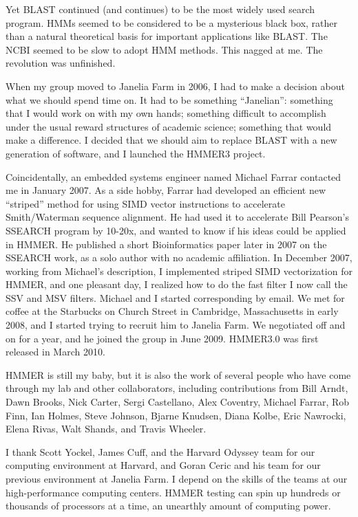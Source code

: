 Yet BLAST continued (and continues) to be the most widely used search
program. HMMs seemed to be considered to be a mysterious black box,
rather than a natural theoretical basis for important applications
like BLAST. The NCBI seemed to be slow to adopt HMM methods. This
nagged at me. The revolution was unfinished.

When my group moved to Janelia Farm in 2006, I had to make a decision
about what we should spend time on. It had to be something
``Janelian'': something that I would work on with my own hands;
something difficult to accomplish under the usual reward structures of
academic science; something that would make a difference. I decided
that we should aim to replace BLAST with a new generation of software,
and I launched the HMMER3 project.

Coincidentally, an embedded systems engineer named Michael Farrar
contacted me in January 2007. As a side hobby, Farrar had developed an
efficient new ``striped'' method for using SIMD vector instructions to
accelerate Smith/Waterman sequence alignment. He had used it to
accelerate Bill Pearson's SSEARCH program by 10-20x, and wanted to
know if his ideas could be applied in HMMER. He published a short
Bioinformatics paper later in 2007 on the SSEARCH work, as a solo
author with no academic affiliation. In December 2007, working from
Michael's description, I implemented striped SIMD vectorization for
HMMER, and one pleasant day, I realized how to do the fast filter I
now call the SSV and MSV filters. Michael and I started corresponding
by email. We met for coffee at the Starbucks on Church Street in
Cambridge, Massachusetts in early 2008, and I started trying to
recruit him to Janelia Farm. We negotiated off and on for a year, and
he joined the group in June 2009. HMMER3.0 was first released in March
2010.

HMMER is still my baby, but it is also the work of several people who
have come through my lab and other collaborators, including
contributions from Bill Arndt, Dawn Brooks, Nick Carter, Sergi
Castellano, Alex Coventry, Michael Farrar, Rob Finn, Ian Holmes, Steve
Johnson, Bjarne Knudsen, Diana Kolbe, Eric Nawrocki, Elena Rivas, Walt
Shands, and Travis Wheeler.

I thank Scott Yockel, James Cuff, and the Harvard Odyssey team for our
computing environment at Harvard, and Goran Ceric and his team for our
previous environment at Janelia Farm. I depend on the skills of the
teams at our high-performance computing centers. HMMER testing can
spin up hundreds or thousands of processors at a time, an unearthly
amount of computing power.

